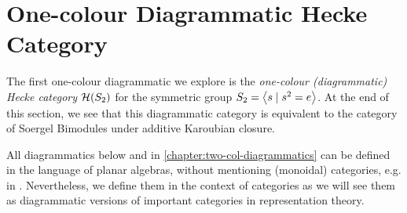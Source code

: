 \section{One-colour Diagrammatic Hecke Category}
\label{sec:one-col-sbim}

The first one-colour diagrammatic we explore is the \textit{one-colour (diagrammatic) Hecke category} $\mathcal{H}(S_2)$ for the symmetric group $S_2 = {\left\langle s \mathrel{|} s^2 = e \right\rangle}$. At the end of this section, we see that this diagrammatic category is equivalent to the category of Soergel Bimodules under additive Karoubian closure.

\begin{remark}
    All diagrammatics below and in \autoref{chapter:two-col-diagrammatics} can be defined in the language of planar algebras, without mentioning (monoidal) categories, e.g. in \cite{jones-planar-algebra}. Nevertheless, we define them in the context of categories as we will see them as diagrammatic versions of important categories in representation theory.
\end{remark}


